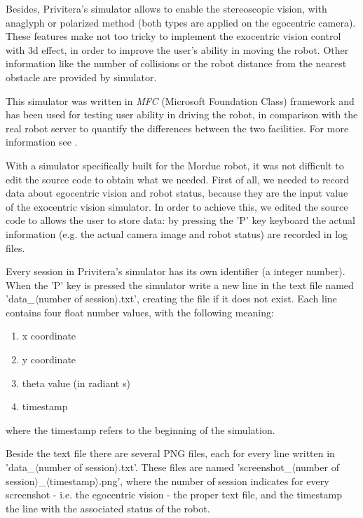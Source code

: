%
Besides, Privitera's simulator allows to enable the 
stereoscopic vision, with anaglyph or polarized method (both 
types are applied on the egocentric camera). These features 
make not too tricky to implement the exocentric vision control 
with 3d effect, in order to improve the user's ability in 
moving the robot. Other information like the number of collisions 
or the robot distance from the nearest obstacle are provided 
by simulator.
%

%
This simulator was written in \textit{MFC} (Microsoft Foundation Class) 
framework and has been used for testing user ability in
driving the robot, in comparison with the real robot server 
to quantify the differences between the two facilities. 
For more information see \cite{privitera}.
%

%
With a simulator specifically built for the Morduc robot, it 
was not difficult to edit the source code to obtain what we 
needed. First of all, we needed to record data about egocentric 
vision and robot status, because they are the input value 
of the exocentric vision simulator. In order to achieve this, 
we edited the source code to allows the user to store data: by 
pressing the 'P' key keyboard the actual information (e.g. the 
actual camera image and robot status) are recorded in log files.
%

%
Every session in Privitera's simulator has its own identifier 
(a integer number). When the 'P' key is pressed the simulator 
write a new line in the text file named 'data\_$\langle$number 
of session$\rangle$.txt', creating the file if it does not 
exist. Each line contains four float number values, with the 
following meaning:
%
\begin{enumerate}
\item x coordinate
\item y coordinate
\item theta value (in radiant s)
\item timestamp
\end{enumerate}
%
where the timestamp refers to the beginning of the simulation.
%

%
Beside the text file there are several PNG files, each for every 
line written in 'data\_$\langle$number of session$\rangle$.txt'. 
These files are named 'screenshot\_$\langle$number of 
session$\rangle$\_$\langle$timestamp$\rangle$.png', where the 
number of session indicates for every screenshot 
- i.e. the egocentric vision - the proper text file, and the 
timestamp the line with the associated status of the robot.
%

